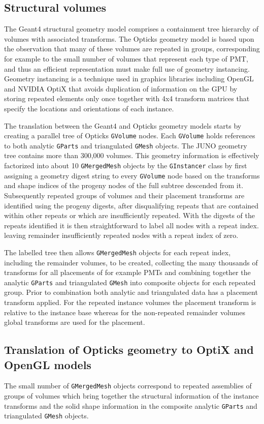 \documentclass{webofc}
\begin{document}
\subsection{Structural volumes}%
%
The Geant4 structural geometry model comprises a containment tree hierarchy of volumes with associated transforms.
The Opticks geometry model is based upon the observation that many of these volumes are 
repeated in groups, corresponding for example to the small number of volumes that represent each type of PMT, 
and thus an efficient representation must make full use of geometry instancing. 
Geometry instancing is a technique used in graphics libraries including OpenGL and NVIDIA OptiX that 
avoids duplication of information on the GPU by storing repeated elements only once together 
with 4x4 transform matrices that specify the locations and orientations of each instance.

The translation between the Geant4 and Opticks geometry models starts by creating 
a parallel tree of Opticks {\tt GVolume} nodes. Each {\tt GVolume} holds references to both 
analytic {\tt GParts} and triangulated {\tt GMesh} objects.
The JUNO geometry tree contains more than 300,000 volumes.  This geometry information 
is effectively factorized into about 10 {\tt GMergedMesh} objects by the {\tt GInstancer} class
by first assigning a geometry digest string to every {\tt GVolume} node based on the transforms and shape 
indices of the progeny nodes of the full subtree descended from it. 
Subsequently repeated groups of volumes and their placement transforms are identified using the progeny digests, 
after disqualifying repeats that are contained within other repeats or which are insufficiently repeated.
With the digests of the repeats identified it is then straightforward to label all nodes with a repeat index.
leaving remainder insufficiently repeated nodes with a repeat index of zero.

The labelled tree then allows {\tt GMergedMesh} objects for each repeat index, including the remainder volumes, 
to be created, collecting the many thousands of transforms for all placements of for example PMTs and 
combining together the analytic {\tt GParts} and triangulated {\tt GMesh} into composite objects for
each repeated group. Prior to combination both analytic and triangulated data has a
placement transform applied. For the repeated instance volumes the placement 
transform is relative to the instance base whereas for the non-repeated remainder volumes global 
transforms are used for the placement.
%
\subsection{Translation of Opticks geometry to OptiX and OpenGL models}%
%
The small number of {\tt GMergedMesh} objects correspond to repeated assemblies of groups of volumes
which bring together the structural information of the instance transforms and the solid shape information 
in the composite analytic {\tt GParts} and triangulated {\tt GMesh} objects.
\end{document}
